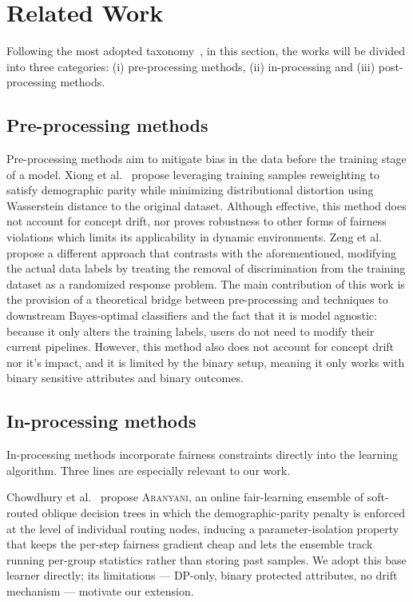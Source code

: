 \documentclass[sigconf,anonymous,review]{acmart}
\begin{document}
\section{Related Work}
Following the most adopted taxonomy~\cite{Salazar_2026}, in this section, the works will be divided into three categories: (i) pre-processing methods, (ii) in-processing and (iii) post-processing methods.
\subsection{Pre-processing methods}
Pre-processing methods aim to mitigate bias in the data before the training stage of a model. Xiong et al.~\cite{Xiong_Dalmasso_Mishler_Potluru_Balch_Veloso_2024} 
propose leveraging training samples reweighting to satisfy demographic parity while minimizing distributional distortion using Wasserstein distance to the original dataset. Although
effective, this method does not account for concept drift, nor proves robustness to other forms of fairness violations which limits its applicability in dynamic environments.
Zeng et al.~\cite{zeng2024fairrrpreprocessinggroupfairness} propose a different approach that contrasts with the aforementioned, modifying the actual data labels by treating the 
removal of discrimination from the training dataset as a randomized response problem. The main contribution of this work is the provision 
of a theoretical bridge between pre-processing and techniques to downstream Bayes-optimal classifiers and the fact that it is model agnostic: because it only alters 
the training labels, users do not need to modify their current pipelines. However, this method also does not account for concept drift nor it's impact, and it is limited 
by the binary setup, meaning it only works with binary sensitive attributes and binary outcomes.
\subsection{In-processing methods}
In-processing methods incorporate fairness constraints directly into the learning algorithm. Three lines are especially relevant to our work.

Chowdhury et al.~\cite{chowdhury2024enhancing} propose \textsc{Aranyani}, an online fair-learning ensemble of soft-routed oblique decision trees in which the demographic-parity penalty is enforced at the level of individual routing nodes, inducing a parameter-isolation property that keeps the per-step fairness gradient cheap and lets the ensemble track running per-group statistics rather than storing past samples. We adopt this base learner directly; its limitations --- DP-only, binary protected attributes, no drift mechanism --- motivate our extension.
\end{document}
